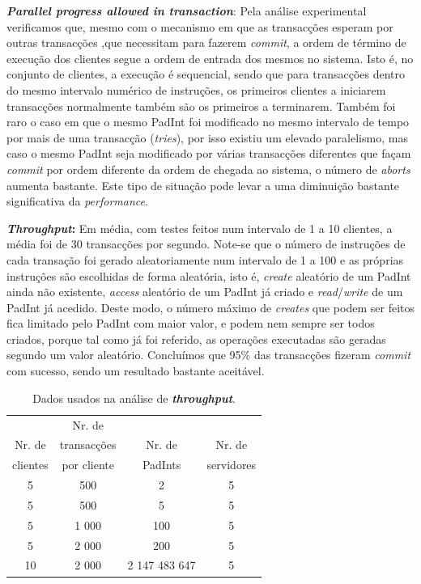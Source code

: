 \begin{description}
\item{\textbf{\textit{Parallel progress allowed in transaction}}:}
Pela análise experimental verificamos que, mesmo com o mecanismo em que as transacções esperam por outras transacções ,que necessitam para fazerem \textit{commit}, a ordem de término de execução dos clientes segue a ordem de entrada dos mesmos no sistema. Isto é, no conjunto de clientes, a execução é sequencial, sendo que para transacções dentro do mesmo intervalo numérico de instruções, os primeiros clientes a iniciarem transacções normalmente também são os primeiros a terminarem. Também foi raro o caso em que o mesmo PadInt foi modificado no mesmo intervalo de tempo por mais de uma transacção (\textit{tries}), por isso existiu um elevado paralelismo, mas caso o mesmo PadInt seja modificado por várias transacções diferentes que façam \textit{commit} por ordem diferente da ordem de chegada ao sistema,  o número de \textit{aborts} aumenta bastante. Este tipo de situação pode levar a uma diminuição bastante significativa da \textit{performance}.

\item{\textbf{\textit{Throughput}:}} 
Em média, com testes feitos num intervalo de 1 a 10 clientes, a média foi de 30 transacções por segundo.  Note-se que o número de instruções de cada transação foi gerado aleatoriamente num intervalo de 1 a 100 e as próprias instruções são escolhidas de forma aleatória, isto é, \textit{create} aleatório de um PadInt ainda não existente, \textit{access} aleatório de um PadInt já criado e \textit{read}/\textit{write} de um PadInt já acedido. Deste modo, o número máximo de \textit{creates} que podem ser feitos fica limitado pelo PadInt com maior valor, e podem nem sempre ser todos criados, porque tal como já foi referido, as operações executadas são geradas segundo um valor aleatório. Concluímos que 95\% das transacções fizeram \textit{commit} com sucesso, sendo um resultado bastante aceitável.

\begin{table}[htb]
\centering
\begin{tabular}{c|c|c|c}
 & Nr. de & & \\
 Nr. de& transacções &  Nr. de & Nr. de \\
clientes & por cliente & PadInts & servidores \\\hline
5 & 500 & 2 & 5\\
5 & 500 & 5 & 5\\
5 & 1 000 & 100 & 5\\
5 & 2 000 & 200 & 5\\
10 & 2 000 & 2 147 483 647 & 5\\
\end{tabular}
\caption{\label{tab:throughput}Dados usados na análise de \textbf{\textit{throughput}}.}
\end{table}


\end{description}
